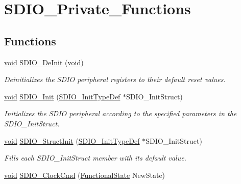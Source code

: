 \hypertarget{group___s_d_i_o___private___functions}{}\section{S\+D\+I\+O\+\_\+\+Private\+\_\+\+Functions}
\label{group___s_d_i_o___private___functions}
\subsection*{Functions}
\begin{DoxyCompactItemize}
\item 
\hyperlink{usb__devapi_8h_afabf60e7f57651d6d595a02c75f07cd0}{void} \hyperlink{group___s_d_i_o___private___functions_gac359d2c6c67a2590f8f9b720c0e4ff1b}{S\+D\+I\+O\+\_\+\+De\+Init} (\hyperlink{usb__devapi_8h_afabf60e7f57651d6d595a02c75f07cd0}{void})
\begin{DoxyCompactList}\small\item\em Deinitializes the S\+D\+IO peripheral registers to their default reset values. \end{DoxyCompactList}\item 
\hyperlink{usb__devapi_8h_afabf60e7f57651d6d595a02c75f07cd0}{void} \hyperlink{group___s_d_i_o___private___functions_gad40764a8e37c0ed5c9141ae338ff0203}{S\+D\+I\+O\+\_\+\+Init} (\hyperlink{struct_s_d_i_o___init_type_def}{S\+D\+I\+O\+\_\+\+Init\+Type\+Def} $\ast$S\+D\+I\+O\+\_\+\+Init\+Struct)
\begin{DoxyCompactList}\small\item\em Initializes the S\+D\+IO peripheral according to the specified parameters in the S\+D\+I\+O\+\_\+\+Init\+Struct. \end{DoxyCompactList}\item 
\hyperlink{usb__devapi_8h_afabf60e7f57651d6d595a02c75f07cd0}{void} \hyperlink{group___s_d_i_o___private___functions_ga778d338c29df4fae9ef69432e6df32ad}{S\+D\+I\+O\+\_\+\+Struct\+Init} (\hyperlink{struct_s_d_i_o___init_type_def}{S\+D\+I\+O\+\_\+\+Init\+Type\+Def} $\ast$S\+D\+I\+O\+\_\+\+Init\+Struct)
\begin{DoxyCompactList}\small\item\em Fills each S\+D\+I\+O\+\_\+\+Init\+Struct member with its default value. \end{DoxyCompactList}\item 
\hyperlink{usb__devapi_8h_afabf60e7f57651d6d595a02c75f07cd0}{void} \hyperlink{group___s_d_i_o___private___functions_ga7243b857d6b323748ff3a493b265bedc}{S\+D\+I\+O\+\_\+\+Clock\+Cmd} (\hyperlink{agilefox_2library_2inc_2stm32f10x__type_8h_ac9a7e9a35d2513ec15c3b537aaa4fba1}{Functional\+State} New\+State)

\end{DoxyCompactItemize}
